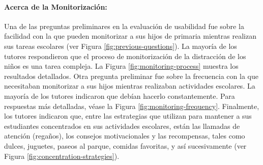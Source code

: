 					\paragraph{\textbf{Acerca de la Monitorización:}}
						Una de las preguntas preliminares en la evaluación de usabilidad fue sobre la facilidad con la que pueden monitorizar a sus hijos de primaria mientras realizan sus tareas escolares (ver Figura \ref{fig:previous-questions}). La mayoría de los tutores respondieron que el proceso de monitorización de la distracción de los niños es una tarea compleja. La Figura \ref{fig:monitoring-process} muestra los resultados detallados. Otra pregunta preliminar fue sobre la frecuencia con la que necesitaban monitorizar a sus hijos mientras realizaban actividades escolares. La mayoría de los tutores indicaron que debían hacerlo constantemente. Para respuestas más detalladas, véase la Figura \ref{fig:monitoring-frequency}. Finalmente, los tutores indicaron que, entre las estrategias que utilizan para mantener a sus estudiantes concentrados en sus actividades escolares, están las llamadas de atención (regaños), los consejos motivacionales y las recompensas, tales como dulces, juguetes, paseos al parque, comidas favoritas, y así sucesivamente (ver Figura \ref{fig:concentration-strategies}).
						
